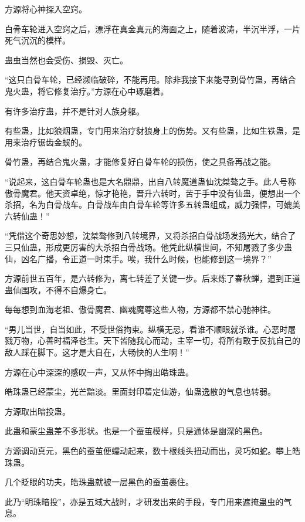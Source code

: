 
\begin{this_body}



方源将心神探入空窍。

白骨车轮进入空窍之后，漂浮在真金真元的海面之上，随着波涛，半沉半浮，一片死气沉沉的模样。

蛊虫当然也会受伤、损毁、灭亡。

“这只白骨车轮，已经濒临破碎，不能再用。除非我接下来能寻到骨竹蛊，再结合鬼火蛊，将它修复治疗。”方源在心中琢磨着。

有许多治疗蛊，并不是针对人族身躯。

有些蛊，比如狼烟蛊，专门用来治疗豺狼身上的伤势。又有些蛊，比如生铁蛊，是用来治疗锯齿金蜈的。

骨竹蛊，再结合鬼火蛊，才能修复好白骨车轮的损伤，使之具备再战之能。

“说起来，这白骨车轮蛊也是大名鼎鼎，出自八转魔道蛊仙沈桀骜之手。此人号称傲骨魔君。他天资卓绝，惊才艳艳，晋升六转时，苦于手中没有仙蛊，便想出一个杀招，名为白骨战车。白骨战车由白骨车轮等许多五转蛊组成，威力强悍，可媲美六转仙蛊！”

“凭借这个奇思妙想，沈桀骜修到八转境界，又将杀招白骨战场发扬光大，结合了三只仙蛊，形成更厉害的大杀招白骨战场。他凭此纵横世间，不知屠戮了多少蛊仙，凶名广播，令正道一时束手。唉，我什么时候，也能修到这一境界？”

方源前世五百年，是六转修为，离七转差了关键一步。后来炼了春秋蝉，遭到正道蛊仙围攻，不得不自爆身亡。

每每想到血海老祖、傲骨魔君、幽魂魔尊这些人物，方源都不禁心驰神往。

“男儿当世，自当如此，不受世俗拘束。纵横无忌，看谁不顺眼就杀谁。心恶时屠戮万物，心善时福泽苍生。天下皆随我心而动，主宰一切，将所有敢于反抗自己的敌人踩在脚下。这才是大自在，大畅快的人生啊！”

方源在心中深深的感叹一声，又从怀中掏出皓珠蛊。

皓珠蛊已经蒙尘，光芒黯淡。里面封印着定仙游，仙蛊逸散的气息也转弱。

方源取出暗投蛊。

此蛊和蒙尘蛊差不多形状。也是一个蚕茧模样，只是通体是幽深的黑色。

方源调动真元，黑色的蚕茧便蠕动起来，数十根线头扭动而出，灵巧如蛇。攀上皓珠蛊。

几个眨眼的功夫，皓珠蛊就被一层黑色的蚕茧裹住。

此乃“明珠暗投”，亦是五域大战时，才研发出来的手段，专门用来遮掩蛊虫的气息。


\end{this_body}
